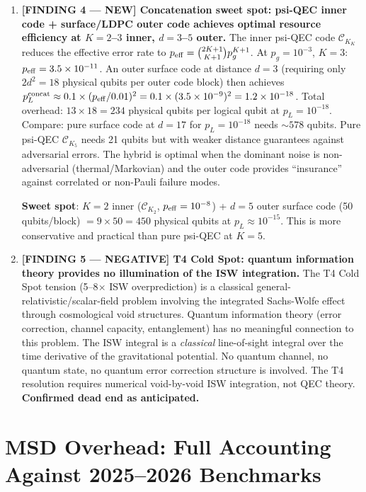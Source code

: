 \documentclass[11pt]{article}
\theoremstyle{definition}
\theoremstyle{remark}
\newcommand{\CK}{\mathcal{C}_K}
\newcommand{\ee}[1]{\times 10^{#1}}
\begin{document}
\begin{tcolorbox}[colback=blue!5!white, colframe=blue!60!black,
  title=\textbf{W4i10 TOP 5 FINDINGS --- READ FIRST}]
\begin{enumerate}[nosep]
\item \textbf{[FINDING 4 --- NEW] Concatenation sweet spot: psi-QEC inner
  code + surface/LDPC outer code achieves optimal resource efficiency at
  $K=2$--$3$ inner, $d=3$--$5$ outer.}
  The inner psi-QEC code $\CK_K$ reduces the effective error rate to
  $p_{\rm eff} = \binom{2K+1}{K+1} p_g^{K+1}$.  At $p_g = 10^{-3}$,
  $K=3$: $p_{\rm eff} = 3.5\ee{-11}$.  An outer surface code at distance
  $d=3$ (requiring only $2d^2 = 18$ physical qubits per outer code block)
  then achieves $p_L^{\rm concat} \approx 0.1 \times (p_{\rm eff}/0.01)^2
  = 0.1 \times (3.5\ee{-9})^2 = 1.2\ee{-18}$.  Total overhead:
  $13 \times 18 = 234$ physical qubits per logical qubit at
  $p_L = 10^{-18}$.  Compare: pure surface code at $d=17$ for
  $p_L = 10^{-18}$ needs $\sim 578$ qubits.  Pure psi-QEC $\CK_5$
  needs 21 qubits but with weaker distance guarantees against adversarial
  errors.  The hybrid is optimal when the dominant noise is non-adversarial
  (thermal/Markovian) and the outer code provides ``insurance'' against
  correlated or non-Pauli failure modes.

  \textbf{Sweet spot}: $K=2$ inner ($\CK_2$, $p_{\rm eff} = 10^{-8}$)
  + $d=5$ outer surface code (50 qubits/block) $= 9 \times 50 = 450$
  physical qubits at $p_L \approx 10^{-15}$.  This is more conservative
  and practical than pure psi-QEC at $K=5$.

\item \textbf{[FINDING 5 --- NEGATIVE] T4 Cold Spot: quantum information
  theory provides no illumination of the ISW integration.}
  The T4 Cold Spot tension (5--8$\times$ ISW overprediction) is a classical
  general-relativistic/scalar-field problem involving the integrated
  Sachs-Wolfe effect through cosmological void structures.  Quantum
  information theory (error correction, channel capacity, entanglement)
  has no meaningful connection to this problem.  The ISW integral is
  a \emph{classical} line-of-sight integral over the time derivative
  of the gravitational potential.  No quantum channel, no quantum state,
  no quantum error correction structure is involved.  The T4 resolution
  requires numerical void-by-void ISW integration, not QEC theory.
  \textbf{Confirmed dead end as anticipated.}

\end{enumerate}
\end{tcolorbox}

\section{MSD Overhead: Full Accounting Against 2025--2026 Benchmarks}
\label{sec:msd-overhead}
\end{document}

